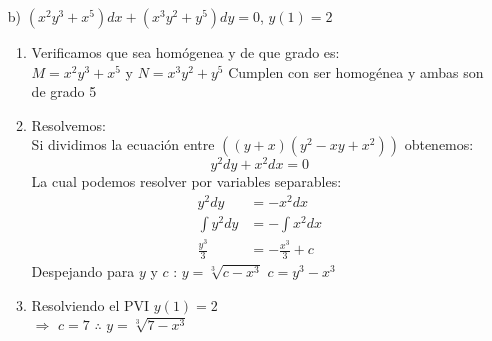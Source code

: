 \begin{itemize}
\begin{enumerate}
    \begin{center}
    \end{center}
    
    
     \end{enumerate}
    
    
    
    
    
     \item[b)] $(x^2y^3+x^5)dx + (x^3y^2+y^5)dy=0$, \hspace{1cm} $y(1)=2$
     \begin{enumerate}
         \item Verificamos que sea homógenea y de que grado es:\\
         $M=x^2y^3+x^5$\hspace{.3cm} y \hspace{.3cm} $N=x^3y^2+y^5$ \hspace{.3cm}  Cumplen con ser homogénea y ambas son de grado 5
         \item Resolvemos:\\
         Si dividimos la ecuación entre $\left((y+x)(y^2-xy+x^2)\right)$ obtenemos:
         \begin{equation*}
             y^2dy+x^2dx=0
         \end{equation*}
         La cual podemos resolver por variables separables:
         \begin{align*} 
             y^2dy  &= -x^2dx\\
             \int y^2dy &= - \int x^2dx\\
             \frac{y^3}{3}  &= - \frac{x^3}{3} + c
         \end{align*}
Despejando para $y$ y  $c$ : \hspace{1cm} $y = \sqrt[3]{c-x^3}$ \hspace{2cm}  $c = y^3- x^3$
       \item Resolviendo el PVI  \hspace{1cm}$y(1)=2$ \\
       $\Rightarrow$ \hspace{1cm} $c=7$ \hspace{4cm}$\therefore$\hspace{.2cm} $y=\sqrt[3]{7-x^3}$
       
       \begin{center}
       \end{center}
       
       
     \end{enumerate}
\end{itemize}